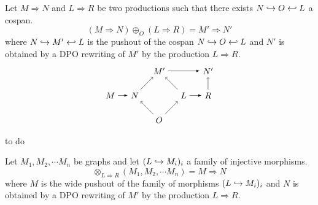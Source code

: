 
\begin{definition}
\label{def:seq_comb}
  Let $M\Rightarrow N$ and $L\Rightarrow R$ be two productions such that there exists $N\hookrightarrow O \hookleftarrow L$ a cospan.
  \[
  (M\Rightarrow N)\oplus_O (L\Rightarrow R) = M'\Rightarrow N'
  \]
  where $N\hookrightarrow M' \hookleftarrow L$ is the pushout of the cospan $N\hookrightarrow O \hookleftarrow L$ and $N'$ is obtained by a DPO rewriting of $M'$ by the production $L\Rightarrow R$.
  \[
  \begin{tikzpicture} %
    \node (o) at (0,-1) {\(O\)};
    \node (mp) at (0,1) {\(M'\)};
    \node (m) at (-2,0) {\(M\)};
    \node (n) at (-1,0) {\(N\)};
    \node (l) at (1,0) {\(L\)};
    \node (r) at (2,0) {\(R\)};
    \node (np) at (2,1) {\(N'\)};
    \draw [->] (o) -- (n);
    \draw [->] (o) -- (l);
    \draw [->] (n) -- (mp);
    \draw [->] (l) -- (mp);
    \draw [->] (r) -- (np);
    \draw [>=latex, ->] (m) -- (n);
    \draw [>=latex, ->] (l) -- (r);
    \draw [>=latex, ->] (mp) -- (np);
  \end{tikzpicture}
  \]
\end{definition}

\begin{definition}
  \begin{mdframed}[backgroundcolor=blue!20]
    to do
  \end{mdframed}
\end{definition}

\begin{definition}
  \label{def:conc_comb}
  Let $M_1, M_2, \cdots M_n$ be graphs and let $(L\hookrightarrow M_i)_i$ a family of injective morphisms.
  \[
  \otimes_{L\Rightarrow R}(M_1, M_2, \cdots M_n) = M \Rightarrow N
  \]
  where $M$ is the wide pushout of the family of morphisms $(L\hookrightarrow M_i)_i$ and $N$ is obtained by a DPO rewriting of $M'$ by the production $L\Rightarrow R$.
\end{definition}

